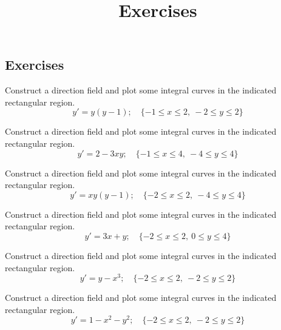 \documentclass{ximera}
\title{Exercises} \license{CC BY-NC-SA 4.0}
\begin{document}
\begin{abstract}
\end{abstract}
\maketitle

\begin{onlineOnly}
\section*{Exercises}
\end{onlineOnly}



\begin{problem}\label{exer:1.3.12} Construct a direction field and plot some integral curves in the indicated rectangular region.
$$y'=y(y-1);    \quad  \{-1\leq x\leq 2,\ -2\leq y\le2\}$$
\end{problem}

\begin{problem}\label{exer:1.3.13} Construct a direction field and plot some integral curves in the indicated rectangular region.
$$y'=2-3xy;    \quad  \{-1\leq x\leq 4,\ -4\leq y\leq 4\}$$
\end{problem}

\begin{problem}\label{exer:1.3.14} Construct a direction field and plot some integral curves in the indicated rectangular region.
$$y'=xy(y-1);    \quad  \{-2\leq x\leq 2,\ -4\leq y\leq 4\}$$
\end{problem}

\begin{problem}\label{exer:1.3.15} Construct a direction field and plot some integral curves in the indicated rectangular region.
$$y'=3x+y;    \quad  \{-2\leq x\leq 2,\ 0\leq y\leq 4\}$$
\end{problem}

\begin{problem}\label{exer:1.3.16} Construct a direction field and plot some integral curves in the indicated rectangular region.
$$y'=y-x^3;    \quad  \{-2\leq x\leq 2,\ -2\leq y\leq 2\}$$
\end{problem}

\begin{problem}\label{exer:1.3.17} Construct a direction field and plot some integral curves in the indicated rectangular region.
$$y'=1-x^2-y^2;    \quad  \{-2\leq x\leq 2,\ -2\leq y\leq 2\}$$
\end{problem}
\end{document}
